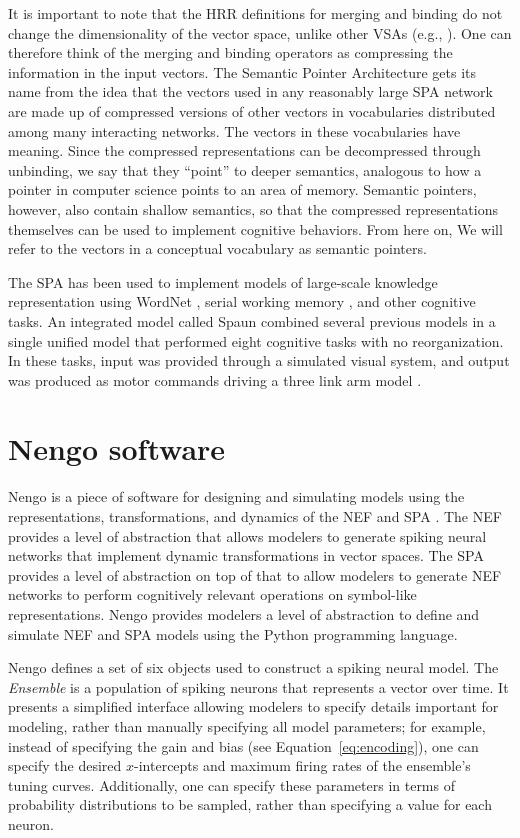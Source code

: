 {{It is important to note that
the HRR definitions for merging and binding
do not change the dimensionality
of the vector space, unlike other VSAs
(e.g., \cite{smolensky1990}).
One can therefore think of the
merging and binding operators
as compressing the information
in the input vectors.
The Semantic Pointer Architecture
gets its name from the idea that
the vectors used
in any reasonably large SPA network
are made up of compressed versions
of other vectors in vocabularies
distributed among many interacting networks.
The vectors in these vocabularies
have meaning.
Since the compressed representations
can be decompressed through unbinding,
we say that they ``point''
to deeper semantics,
analogous to how a pointer in computer science
points to an area of memory.
Semantic pointers, however,
also contain shallow semantics,
so that the compressed
representations themselves
can be used to implement cognitive behaviors.
From here on, We will refer to
the vectors in a conceptual vocabulary
as semantic pointers.

The SPA has been used to implement
models of large-scale knowledge representation
using WordNet \cite{crawford2015},
serial working memory \cite{choo2010},
and other cognitive tasks.
An integrated model called Spaun
combined several previous models
in a single unified model
that performed eight cognitive tasks
with no reorganization.
In these tasks, input was provided
through a simulated visual system,
and output was produced
as motor commands driving
a three link arm model
\cite{eliasmith2012,eliasmith2013}.

\section{Nengo software}
\label{sec:nengo}

Nengo is a piece of software
for designing and simulating
models using the representations,
transformations, and dynamics
of the NEF and SPA
\cite{bekolay2013}.
The NEF provides a level of abstraction
that allows modelers to generate
spiking neural networks
that implement dynamic transformations
in vector spaces.
The SPA provides a level of abstraction
on top of that
to allow modelers to generate
NEF networks to perform
cognitively relevant operations
on symbol-like representations.
Nengo provides modelers
a level of abstraction to
define and simulate NEF and SPA models
using the Python programming language.

Nengo defines a set of six objects
used to construct a spiking neural model.
The \textit{Ensemble} is
a population of spiking neurons
that represents a vector over time.
It presents a simplified interface
allowing modelers to specify
details important for modeling,
rather than manually specifying
all model parameters;
for example, instead of specifying
the gain and bias
(see Equation~\eqref{eq:encoding}),
one can specify the desired
$x$-intercepts and maximum firing rates
of the ensemble's tuning curves.
Additionally, one can specify
these parameters in terms of
probability distributions
to be sampled,
rather than specifying a value for each neuron.

}}
